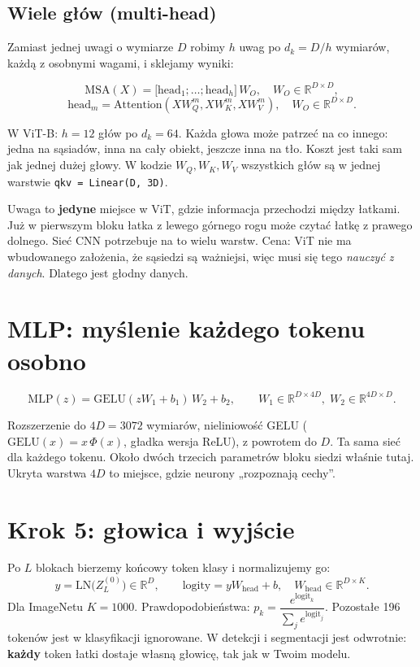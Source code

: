 \documentclass[11pt,a4paper]{article}
\begin{document}
\subsection{Wiele głów (multi-head)}
Zamiast jednej uwagi o wymiarze $D$ robimy $h$ uwag po $d_k=D/h$ wymiarów, każdą z osobnymi
wagami, i sklejamy wyniki:
\begin{wzor}
\[
\mathrm{MSA}(X)=\big[\mathrm{head}_1;\dots;\mathrm{head}_h\big]\,W_O,\quad W_O\in\mathbb{R}^{D\times D},
\]
\[
\mathrm{head}_m=\mathrm{Attention}(XW_Q^{m},XW_K^{m},XW_V^{m}),\quad W_O\in\mathbb{R}^{D\times D}.
\]
\end{wzor}
W ViT-B: $h=12$ głów po $d_k=64$. Każda głowa może patrzeć na co innego: jedna na sąsiadów,
inna na cały obiekt, jeszcze inna na tło. Koszt jest taki sam jak jednej dużej głowy. W kodzie
$W_Q,W_K,W_V$ wszystkich głów są w jednej warstwie \texttt{qkv = Linear(D, 3D)}.

\begin{intuicja}
Uwaga to \textbf{jedyne} miejsce w ViT, gdzie informacja przechodzi między łatkami. Już w
pierwszym bloku łatka z lewego górnego rogu może czytać łatkę z prawego dolnego. Sieć CNN
potrzebuje na to wielu warstw. Cena: ViT nie ma wbudowanego założenia, że sąsiedzi są ważniejsi,
więc musi się tego \emph{nauczyć z danych}. Dlatego jest głodny danych.
\end{intuicja}

\section{MLP: myślenie każdego tokenu osobno}
\begin{wzor}
\[ \mathrm{MLP}(z)=\mathrm{GELU}(zW_1+b_1)\,W_2+b_2,\qquad W_1\in\mathbb{R}^{D\times4D},\;W_2\in\mathbb{R}^{4D\times D}. \]
\end{wzor}
Rozszerzenie do $4D=3072$ wymiarów, nieliniowość GELU ($\mathrm{GELU}(x)=x\,\Phi(x)$, gładka wersja
ReLU), z powrotem do $D$. Ta sama sieć dla każdego tokenu. Około dwóch trzecich parametrów bloku
siedzi właśnie tutaj. Ukryta warstwa $4D$ to miejsce, gdzie neurony „rozpoznają cechy''.

\section{Krok 5: głowica i wyjście}
Po $L$ blokach bierzemy końcowy token klasy i normalizujemy go:
\[ y=\mathrm{LN}\big(Z_L^{(0)}\big)\in\mathbb{R}^{D},\qquad \text{logity}=yW_{\text{head}}+b,\quad W_{\text{head}}\in\mathbb{R}^{D\times K}. \]
Dla ImageNetu $K=1000$. Prawdopodobieństwa: $p_k=\dfrac{e^{\text{logit}_k}}{\sum_j e^{\text{logit}_j}}$.
Pozostałe 196 tokenów jest w klasyfikacji ignorowane. W detekcji i segmentacji jest odwrotnie:
\textbf{każdy} token łatki dostaje własną głowicę, tak jak w Twoim modelu.
\end{document}
